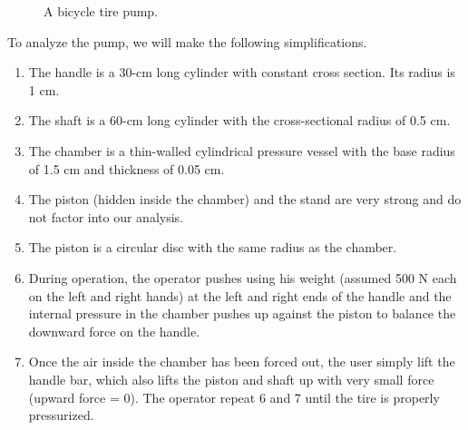 \documentclass[a4paper,openany,nobib]{tufte-book}
\begin{document}
{{\begin{figure}[h]
  \centering
  \caption{A bicycle tire pump.}
  \label{fig: bike pump}
\end{figure}

To analyze the pump, we will make the following simplifications.

\begin{enumerate}
\item The handle is a 30-cm long cylinder with constant cross section. Its
radius is 1 cm.

\item The shaft is a 60-cm long cylinder with the cross-sectional radius of
0.5 cm.

\item The chamber is a thin-walled cylindrical pressure vessel with the
base radius of 1.5 cm and thickness of 0.05 cm.

\item The piston (hidden inside the chamber) and the stand are very strong
and do not factor into our analysis.

\item The piston is a circular disc with the same radius as the chamber.

\item During operation, the operator pushes using his weight (assumed 500 N
each on the left and right hands) at the left and right ends of the
handle and the internal pressure in the chamber pushes up against the
piston to balance the downward force on the handle.

\item Once the air inside the chamber has been forced out, the user simply
lift the handle bar, which also lifts the piston and shaft up with
very small force (upward force = 0). The operator repeat 6 and 7
until the tire is properly pressurized.


\end{enumerate}}}
\end{document}
